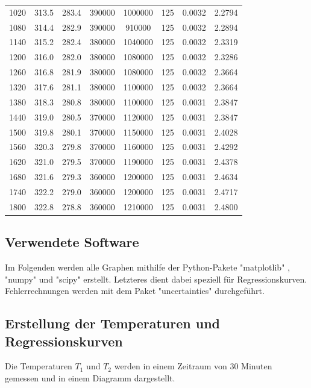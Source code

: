 \begin{table}[H]
\begin{tabular}{c c c c c c c c}
    1020  &  313.5 &  283.4 & 390000  & 1000000 & 125 & 0.0032 & 2.2794 \\
    1080  &  314.4 &  282.9 & 390000  &  910000 & 125 & 0.0032 & 2.2894 \\
    1140  &  315.2 &  282.4 & 380000  & 1040000 & 125 & 0.0032 & 2.3319 \\
    1200  &  316.0 &  282.0 & 380000  & 1080000 & 125 & 0.0032 & 2.3286 \\
    1260  &  316.8 &  281.9 & 380000  & 1080000 & 125 & 0.0032 & 2.3664 \\
    1320  &  317.6 &  281.1 & 380000  & 1100000 & 125 & 0.0032 & 2.3664 \\
    1380  &  318.3 &  280.8 & 380000  & 1100000 & 125 & 0.0031 & 2.3847 \\
    1440  &  319.0 &  280.5 & 370000  & 1120000 & 125 & 0.0031 & 2.3847 \\
    1500  &  319.8 &  280.1 & 370000  & 1150000 & 125 & 0.0031 & 2.4028 \\
    1560  &  320.3 &  279.8 & 370000  & 1160000 & 125 & 0.0031 & 2.4292 \\
    1620  &  321.0 &  279.5 & 370000  & 1190000 & 125 & 0.0031 & 2.4378 \\
    1680  &  321.6 &  279.3 & 360000  & 1200000 & 125 & 0.0031 & 2.4634 \\
    1740  &  322.2 &  279.0 & 360000  & 1200000 & 125 & 0.0031 & 2.4717 \\
    1800  &  322.8 &  278.8 & 360000  & 1210000 & 125 & 0.0031 & 2.4800 \\
    \bottomrule
  \end{tabular}
\end{table}

\subsection{Verwendete Software}
Im Folgenden werden alle Graphen mithilfe der Python-Pakete "matplotlib" \cite{matplotlib},
"numpy" \cite{numpy} und "scipy" \cite{scipy} erstellt. Letzteres dient dabei
speziell für Regressionskurven. \\
Fehlerrechnungen werden mit dem Paket "uncertainties" \cite{uncertainties} durchgeführt.

\subsection{Erstellung der Temperaturen und Regressionskurven}
Die Temperaturen $T_1$ und $T_2$ werden in einem Zeitraum von 30 Minuten gemessen und in einem Diagramm dargestellt.

